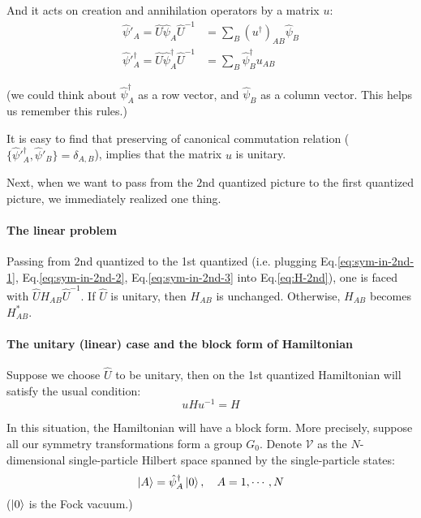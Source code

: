 \documentclass{article}
\begin{document}
And it acts on creation and annihilation operators by a matrix $u$:
\begin{align}
    \label{eq:sym-in-2nd-2}
    \hat{\psi}'_A = 
    \hat{U} \hat\psi_A \hat{U}^{-1} &=
    \sum_B (u^\dagger)_{AB} \hat\psi_B \\
    \label{eq:sym-in-2nd-3}
    \hat\psi'^\dagger_A =
    \hat{U} \hat\psi^\dagger_A \hat{U}^{-1} &= 
    \sum_B  \hat\psi^\dagger_B u_{AB}
\end{align}

(we could think about $ \hat\psi^\dagger_A$ as a row vector, and
$\hat\psi_B$ as a column vector. This helps us remember this rules.)

It is easy to find that preserving of canonical commutation relation
($\{\hat\psi'^\dagger_A,\hat\psi'_B\}=\delta_{A,B}$), implies that the
matrix $u$ is unitary.

Next, when we want to pass from the $2$nd quantized picture to the
first quantized picture, we immediately realized one thing.

\paragraph{The linear problem} Passing from $2$nd quantized to the
1st quantized (i.e. plugging Eq.\ref{eq:sym-in-2nd-1},
Eq.\ref{eq:sym-in-2nd-2}, Eq.\ref{eq:sym-in-2nd-3} into
Eq.\ref{eq:H-2nd}), one is faced with $\hat{U} H_{AB} \hat{U}^{-1}$.
If $\hat{U}$ is unitary, then $H_{AB}$ is unchanged. Otherwise,
$H_{AB}$ becomes $H^*_{AB}$.

\paragraph{The unitary (linear) case and the block form of
Hamiltonian}
Suppose we choose $\hat{U}$ to be unitary, then on the 1st quantized
Hamiltonian will satisfy the usual condition:
\begin{equation}
    u H u^{-1} = H
\end{equation}

In this situation, the Hamiltonian will have a block form. More
precisely, suppose all our symmetry transformations form a group
$G_0$. Denote $\mathcal{V}$ as the $N$-dimensional single-particle
Hilbert space spanned by the single-particle states:
\begin{equation}
    \ket{A} = \hat\psi^\dagger_A \ket{0}, \quad A = 1,\cdots,N
\end{equation}
($\ket{0}$ is the Fock vacuum.)
\end{document}
